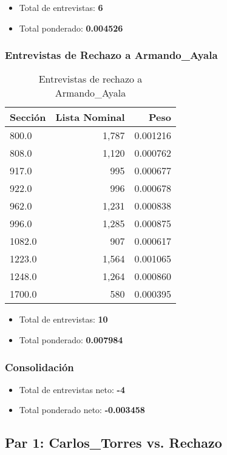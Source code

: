 \documentclass[a4paper,12pt]{article}
\begin{document}
\begin{itemize}
\item Total de entrevistas: \textbf{6}
\item Total ponderado: \textbf{0.004526}
\end{itemize}

\subsubsection*{Entrevistas de Rechazo a Armando_Ayala}
\begin{table}[h]
\centering
\begin{tabular}{lrr}
\toprule
Sección & Lista Nominal & Peso \\ \midrule
800.0 & 1,787 & 0.001216 \\ 
808.0 & 1,120 & 0.000762 \\ 
917.0 & 995 & 0.000677 \\ 
922.0 & 996 & 0.000678 \\ 
962.0 & 1,231 & 0.000838 \\ 
996.0 & 1,285 & 0.000875 \\ 
1082.0 & 907 & 0.000617 \\ 
1223.0 & 1,564 & 0.001065 \\ 
1248.0 & 1,264 & 0.000860 \\ 
1700.0 & 580 & 0.000395 \\ 
\bottomrule
\end{tabular}
\caption{Entrevistas de rechazo a Armando_Ayala}
\end{table}

\begin{itemize}
\item Total de entrevistas: \textbf{10}
\item Total ponderado: \textbf{0.007984}
\end{itemize}

\subsubsection*{Consolidación}
\begin{itemize}
\item Total de entrevistas neto: \textbf{-4}
\item Total ponderado neto: \textbf{-0.003458}
\end{itemize}

\subsection*{Par 1: Carlos_Torres vs. Rechazo}
\end{document}
